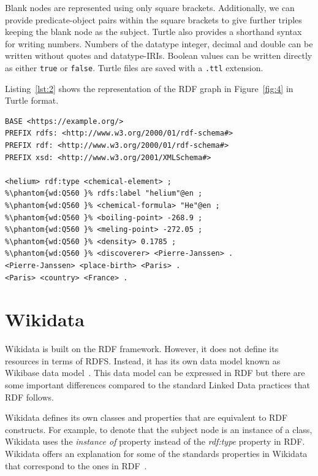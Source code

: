 Blank nodes are represented using only square brackets. Additionally, we can provide predicate-object pairs within the square brackets to give further triples keeping the blank node as the subject. Turtle also provides a shorthand syntax for writing numbers. Numbers of the datatype integer, decimal and double can be written without quotes and datatype-IRIs. Boolean values can be written directly as either \texttt{true} or \texttt{false}. Turtle files are saved with a \texttt{.ttl} extension.

Listing~\ref{lst:2} shows the representation of the RDF graph in Figure~\ref{fig:4} in Turtle format. 

\begin{minipage}{\linewidth}
\begin{lstlisting}[label=lst:2, columns=fullflexible, caption={RDF graph represented in Turtle syntax}, language=SPARQL]
BASE <https://example.org/>
PREFIX rdfs: <http://www.w3.org/2000/01/rdf-schema#>
PREFIX rdf: <http://www.w3.org/2000/01/rdf-schema#>
PREFIX xsd: <http://www.w3.org/2001/XMLSchema#>

<helium> rdf:type <chemical-element> ;
%\phantom{wd:Q560 }% rdfs:label "helium"@en ;
%\phantom{wd:Q560 }% <chemical-formula> "He"@en ;
%\phantom{wd:Q560 }% <boiling-point> -268.9 ;
%\phantom{wd:Q560 }% <meling-point> -272.05 ;
%\phantom{wd:Q560 }% <density> 0.1785 ;
%\phantom{wd:Q560 }% <discoverer> <Pierre-Janssen> .
<Pierre-Janssen> <place-birth> <Paris> .
<Paris> <country> <France> .
\end{lstlisting}
\end{minipage}


\section{Wikidata}

Wikidata is built on the RDF framework. However, it does not define its resources in terms of RDFS. Instead, it has its own data model known as Wikibase data model~\citep{MediaWiki}. This data model can be expressed in RDF but there are some important differences compared to the standard Linked Data practices that RDF follows. 

Wikidata defines its own classes and properties that are equivalent to RDF constructs. For example, to denote that the subject node is an instance of a class, Wikidata uses the \textit{instance of} property instead of the \textit{rdf:type} property in RDF. Wikidata offers an explanation for some of the standards properties in Wikidata that correspond to the ones in RDF~\cite{Foundation}. 

